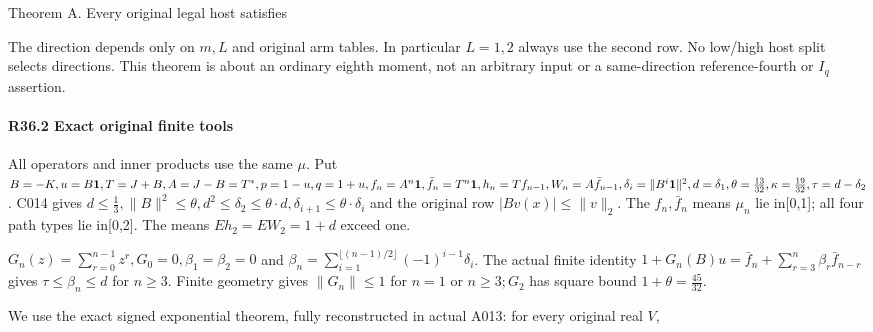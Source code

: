 Theorem A. Every original legal host satisfies


The direction depends only on \(m,\allowbreak \allowbreak L\) and original arm tables. In particular \(L=1,\allowbreak \allowbreak 2\) always use the second row. No low/high host split selects directions. This theorem is about an ordinary eighth moment, not an arbitrary input or a same-direction reference-fourth or \(I_q\) assertion.

\paragraph{R36.2 Exact original finite tools}

All operators and inner products use the same \(\mu\). Put \(B=-K,\allowbreak \allowbreak u=B\mathbf1,\allowbreak \allowbreak  T=J+B,\allowbreak \allowbreak A=J-B=T^*,\allowbreak \allowbreak p=1-u,\allowbreak \allowbreak q=1+u,\allowbreak \allowbreak  f_n=A^n\mathbf1,\allowbreak \allowbreak \bar f_n=T^n\mathbf1,\allowbreak \allowbreak  h_n=Tf_{n-1},\allowbreak \allowbreak W_n=A\bar f_{n-1},\allowbreak \allowbreak \delta_i=\lVert B^i\mathbf1\rVert ^2,\allowbreak \allowbreak d=\delta_1,\allowbreak \allowbreak  \theta=\frac{13}{32},\allowbreak \allowbreak \kappa=\frac{19}{32},\allowbreak \allowbreak \tau=d-\delta_2\). C014 gives \(d\le \frac{1}{3},\allowbreak \allowbreak  \lVert B\rVert ^2\le \theta,\allowbreak \allowbreak  d^2\le \delta_2\le \theta\cdot d,\allowbreak \allowbreak  \delta_{i+1}\le \theta\cdot \delta_i\) and the original row \(\lvert Bv(x)\rvert \le \lVert v\rVert_2\). The \(f_n,\allowbreak \allowbreak \bar f_n\) means \(\mu_n\) lie in[0,1]; all four path types lie in[0,2]. The means $Eh_2=EW_2=1+d$ exceed one.

\(G_n(z)=\sum_{r=0}^{n-1}z^r,\allowbreak \allowbreak  G_{0}=0,\allowbreak \allowbreak  \beta_{1}=\beta_{2}=0\) and \(\beta_n=\sum_{i=1}^{{\lfloor (n-1)/2\rfloor}}(-1)^{i-1}\delta_i\). The actual finite identity \(1+G_n(B)u=\bar f_n+\sum_{r=3}^{n}\beta_r \bar f_{n-r}\) gives \(\tau\le \beta_n\le d\) for \(n\ge 3\). Finite geometry gives \(\lVert G_n\rVert \le 1\) for \(n=1\) or \(n\ge 3; G_{2}\) has square bound \(1+\theta=\frac{45}{32}\).

We use the exact signed exponential theorem, fully reconstructed in actual A013: for every original real \(V\),


